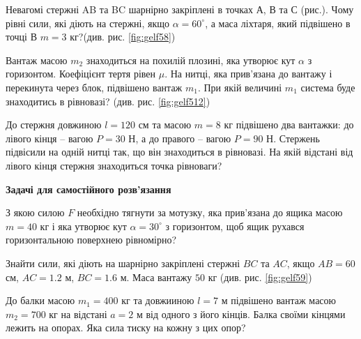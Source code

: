 \begin{problem}{3}
	Невагомі стержні AB та BC шарнірно закріплені в точках А, В та С (рис.). Чому рівні сили, які діють на стержні, якщо $\alpha = 60^{\circ}$, а маса ліхтаря, який підвішено в точці В $m = 3$ кг?(див. рис. \ref{fig:gelf58})
\end{problem}



\begin{problem}{5}
	Вантаж масою $m_2$ знаходиться на похилій плозині, яка утворює кут $\alpha$ з горизонтом. Коефіцієнт тертя рівен $\mu$. На нитці, яка прив'язана до вантажу і перекинута через блок, підвішено вантаж $m_1$. При якій величині $m_1$ система буде знаходитись в рівновазі? (див. рис. \ref{fig:gelf512})
	
\end{problem}

\begin{problem}{6}
	До стержня довжиною $l = 120$ см та масою $m = 8$ кг підвішено два вантажки: до лівого кінця -- вагою $P = 30$ Н, а до правого -- вагою $P = 90$ Н. Стержень підвісили на одній нитці так, що він знаходиться в рівновазі. На якій відстані від лівого кінця стержня знаходиться точка рівноваги?
\end{problem}




\textbf{Задачі для самостійного розв'язання}

\begin{problem}{2}
	З якою силою $F$ необхідно тягнути за мотузку, яка прив'язана до ящика масою $m = 40$ кг і яка утворює кут $\alpha = 30^{\circ}$ з горизонтом, щоб ящик рухався горизонтальною поверхнею рівномірно?
\end{problem}

\begin{problem}{4}
	Знайти сили, які діють на шарнірно закріплені стержні $BC$ та $AC$, якщо $AB = 60$ см, $AC = 1.2$ м, $BC = 1.6$ м. Маса вантажу $50$ кг (див. рис. \ref{fig:gelf59})
\end{problem}

\begin{problem}{7}
	До балки масою $m_1 = 400$ кг та довжииною $l = 7$ м підвішено вантаж масою $m_2 = 700$ кг на відстані $a = 2$ м від одного з його кінців. Балка своїми кінцями лежить на опорах. Яка сила тиску на кожну з цих опор?
\end{problem}